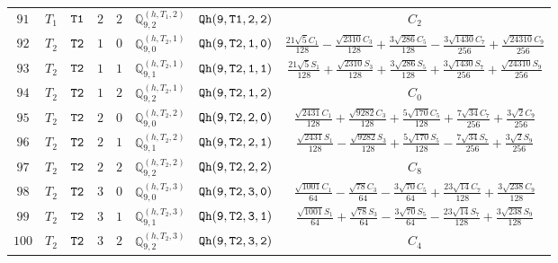 \documentclass[fleqn,8pt]{jsarticle}
\begin{document}
\begin{table}[ht!]
\begin{center}
\begin{tabular}{cccccccc}
$ 91 $ & $ T_{1} $ & $ {\tt T1} $ & $ 2 $ & $ 2 $ & $ \mathbb{Q}_{9,2}^{(h,T_{1},2)} $ & $ {\tt Qh(9,T1,2,2)} $ & $ C_{2} $ \\
$ 92 $ & $ T_{2} $ & $ {\tt T2} $ & $ 1 $ & $ 0 $ & $ \mathbb{Q}_{9,0}^{(h,T_{2},1)} $ & $ {\tt Qh(9,T2,1,0)} $ & $ \frac{21 \sqrt{5} C_{1}}{128} - \frac{\sqrt{2310} C_{3}}{128} + \frac{3 \sqrt{286} C_{5}}{128} - \frac{3 \sqrt{1430} C_{7}}{256} + \frac{\sqrt{24310} C_{9}}{256} $ \\
$ 93 $ & $ T_{2} $ & $ {\tt T2} $ & $ 1 $ & $ 1 $ & $ \mathbb{Q}_{9,1}^{(h,T_{2},1)} $ & $ {\tt Qh(9,T2,1,1)} $ & $ \frac{21 \sqrt{5} S_{1}}{128} + \frac{\sqrt{2310} S_{3}}{128} + \frac{3 \sqrt{286} S_{5}}{128} + \frac{3 \sqrt{1430} S_{7}}{256} + \frac{\sqrt{24310} S_{9}}{256} $ \\
$ 94 $ & $ T_{2} $ & $ {\tt T2} $ & $ 1 $ & $ 2 $ & $ \mathbb{Q}_{9,2}^{(h,T_{2},1)} $ & $ {\tt Qh(9,T2,1,2)} $ & $ C_{0} $ \\
$ 95 $ & $ T_{2} $ & $ {\tt T2} $ & $ 2 $ & $ 0 $ & $ \mathbb{Q}_{9,0}^{(h,T_{2},2)} $ & $ {\tt Qh(9,T2,2,0)} $ & $ \frac{\sqrt{2431} C_{1}}{128} + \frac{\sqrt{9282} C_{3}}{128} + \frac{5 \sqrt{170} C_{5}}{128} + \frac{7 \sqrt{34} C_{7}}{256} + \frac{3 \sqrt{2} C_{9}}{256} $ \\
$ 96 $ & $ T_{2} $ & $ {\tt T2} $ & $ 2 $ & $ 1 $ & $ \mathbb{Q}_{9,1}^{(h,T_{2},2)} $ & $ {\tt Qh(9,T2,2,1)} $ & $ \frac{\sqrt{2431} S_{1}}{128} - \frac{\sqrt{9282} S_{3}}{128} + \frac{5 \sqrt{170} S_{5}}{128} - \frac{7 \sqrt{34} S_{7}}{256} + \frac{3 \sqrt{2} S_{9}}{256} $ \\
$ 97 $ & $ T_{2} $ & $ {\tt T2} $ & $ 2 $ & $ 2 $ & $ \mathbb{Q}_{9,2}^{(h,T_{2},2)} $ & $ {\tt Qh(9,T2,2,2)} $ & $ C_{8} $ \\
$ 98 $ & $ T_{2} $ & $ {\tt T2} $ & $ 3 $ & $ 0 $ & $ \mathbb{Q}_{9,0}^{(h,T_{2},3)} $ & $ {\tt Qh(9,T2,3,0)} $ & $ \frac{\sqrt{1001} C_{1}}{64} - \frac{\sqrt{78} C_{3}}{64} - \frac{3 \sqrt{70} C_{5}}{64} + \frac{23 \sqrt{14} C_{7}}{128} + \frac{3 \sqrt{238} C_{9}}{128} $ \\
$ 99 $ & $ T_{2} $ & $ {\tt T2} $ & $ 3 $ & $ 1 $ & $ \mathbb{Q}_{9,1}^{(h,T_{2},3)} $ & $ {\tt Qh(9,T2,3,1)} $ & $ \frac{\sqrt{1001} S_{1}}{64} + \frac{\sqrt{78} S_{3}}{64} - \frac{3 \sqrt{70} S_{5}}{64} - \frac{23 \sqrt{14} S_{7}}{128} + \frac{3 \sqrt{238} S_{9}}{128} $ \\
$ 100 $ & $ T_{2} $ & $ {\tt T2} $ & $ 3 $ & $ 2 $ & $ \mathbb{Q}_{9,2}^{(h,T_{2},3)} $ & $ {\tt Qh(9,T2,3,2)} $ & $ C_{4} $ \\
 \hline \hline
\end{tabular}
\end{center}
\end{table}
\end{document}

